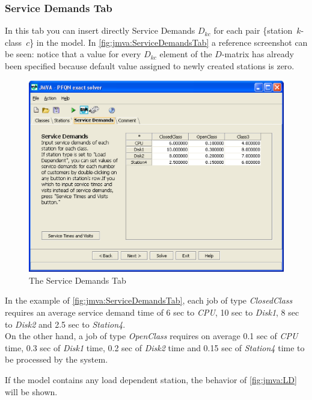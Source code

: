 \subsubsection{Service Demands Tab}
In this tab you can insert directly Service Demands $D_{kc}$ for
each pair \{station~$k$-class~$c$\} in the model. In
\autoref{fig:jmva:ServiceDemandsTab} a reference screenshot can be
seen: notice that a value for every $D_{kc}$ element of the
$D$-matrix has already been specified because default value assigned
to newly created stations is zero.

\begin{figure}[htbp]
    \begin{center}
        \includegraphics[scale=.5]{img/jmva/serviceDemands}
    \end{center}
    \caption{The Service Demands Tab}
    \label{fig:jmva:ServiceDemandsTab}
\end{figure}

In the example of \autoref{fig:jmva:ServiceDemandsTab}, each job of
type \emph{ClosedClass} requires an average service demand time of 6
sec to \emph{CPU}, 10 sec to \emph{Disk1}, 8 sec to
\emph{Disk2} and 2.5 sec to \emph{Station4}.\\
On the other hand, a job of type \emph{OpenClass} requires on
average 0.1 sec of \emph{CPU} time, 0.3 sec of \emph{Disk1} time,
0.2 sec of \emph{Disk2} time and 0.15 sec of \emph{Station4} time to
be processed by the system.

If the model contains any load dependent station, the behavior of
\autoref{fig:jmva:LD} will be shown.

